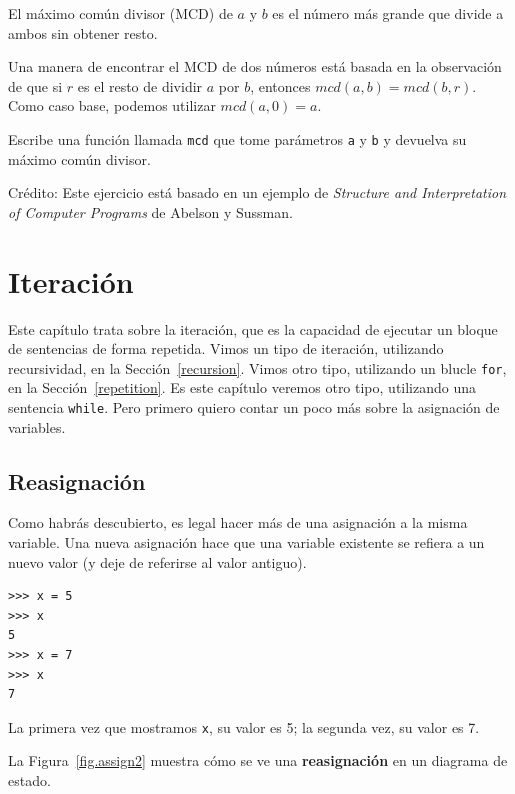 \documentclass[10pt]{book}
\begin{document}
\begin{exercise}

El máximo común divisor (MCD) de $a$ y $b$ es el número más grande
que divide a ambos sin obtener resto.

Una manera de encontrar el MCD de dos números está basada en la observación
de que si $r$ es el resto de dividir $a$ por $b$, entonces $mcd(a,
b) = mcd(b, r)$.  Como caso base, podemos utilizar $mcd(a, 0) = a$.

Escribe una función llamada
\verb"mcd" que tome parámetros {\tt a} y {\tt b}
y devuelva su máximo común divisor.

Crédito: Este ejercicio está basado en un ejemplo de
{\em Structure and Interpretation of Computer Programs} de Abelson y Sussman.

\end{exercise}


\chapter{Iteración}

Este capítulo trata sobre la iteración, que es la capacidad de ejecutar
un bloque de sentencias de forma repetida.  Vimos un tipo de iteración,
utilizando recursividad, en la Sección~\ref{recursion}.
Vimos otro tipo, utilizando un blucle {\tt for},
en la Sección~\ref{repetition}.  Es este capítulo veremos otro
tipo, utilizando una sentencia {\tt while}.
Pero primero quiero contar un poco más sobre la asignación de variables.


\section{Reasignación}

Como habrás descubierto, es legal hacer más de una
asignación a la misma variable.  Una nueva asignación hace que una variable existente
se refiera a un nuevo valor (y deje de referirse al valor antiguo).

\begin{verbatim}
>>> x = 5
>>> x
5
>>> x = 7
>>> x
7
\end{verbatim}
%
La primera vez que mostramos
{\tt x}, su valor es 5; la segunda vez, su
valor es 7.

La Figura~\ref{fig.assign2} muestra cómo se ve una {\bf reasignación}
en un diagrama de estado.  
\end{document}
